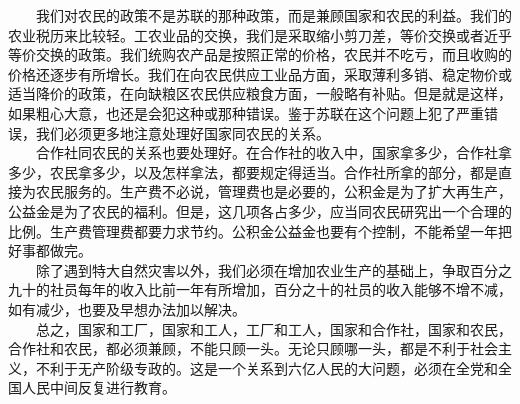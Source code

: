 \documentclass[cn,11pt,chinese]{elegantbook}
\begin{document}
　　我们对农民的政策不是苏联的那种政策，而是兼顾国家和农民的利益。我们的农业税历来比较轻。工农业品的交换，我们是采取缩小剪刀差，等价交换或者近乎等价交换的政策。我们统购农产品是按照正常的价格，农民并不吃亏，而且收购的价格还逐步有所增长。我们在向农民供应工业品方面，采取薄利多销、稳定物价或适当降价的政策，在向缺粮区农民供应粮食方面，一般略有补贴。但是就是这样，如果粗心大意，也还是会犯这种或那种错误。鉴于苏联在这个问题上犯了严重错误，我们必须更多地注意处理好国家同农民的关系。\\
　　合作社同农民的关系也要处理好。在合作社的收入中，国家拿多少，合作社拿多少，农民拿多少，以及怎样拿法，都要规定得适当。合作社所拿的部分，都是直接为农民服务的。生产费不必说，管理费也是必要的，公积金是为了扩大再生产，公益金是为了农民的福利。但是，这几项各占多少，应当同农民研究出一个合理的比例。生产费管理费都要力求节约。公积金公益金也要有个控制，不能希望一年把好事都做完。\\
　　除了遇到特大自然灾害以外，我们必须在增加农业生产的基础上，争取百分之九十的社员每年的收入比前一年有所增加，百分之十的社员的收入能够不增不减，如有减少，也要及早想办法加以解决。\\
　　总之，国家和工厂，国家和工人，工厂和工人，国家和合作社，国家和农民，合作社和农民，都必须兼顾，不能只顾一头。无论只顾哪一头，都是不利于社会主义，不利于无产阶级专政的。这是一个关系到六亿人民的大问题，必须在全党和全国人民中间反复进行教育。\\
\end{document}
